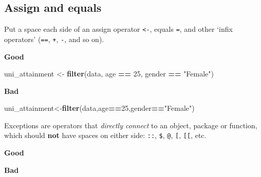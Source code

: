 \documentclass[]{book}
\newenvironment{Shaded}{\begin{snugshade}}{\end{snugshade}}
\newcommand{\DecValTok}[1]{\textcolor[rgb]{0.00,0.00,0.81}{#1}}
\newcommand{\KeywordTok}[1]{\textcolor[rgb]{0.13,0.29,0.53}{\textbf{#1}}}
\newcommand{\NormalTok}[1]{#1}
\newcommand{\OperatorTok}[1]{\textcolor[rgb]{0.81,0.36,0.00}{\textbf{#1}}}
\newcommand{\StringTok}[1]{\textcolor[rgb]{0.31,0.60,0.02}{#1}}
\begin{document}
\hypertarget{assign-and-equals}{%
\subsection{Assign and equals}\label{assign-and-equals}}

Put a space each side of an assign operator \texttt{\textless{}-}, equals \texttt{=}, and other `infix operators' (\texttt{==}, \texttt{+}, \texttt{-}, and so on).

\textbf{Good}

\begin{Shaded}
\begin{Highlighting}[]
\NormalTok{uni_attainment <-}\StringTok{ }\KeywordTok{filter}\NormalTok{(data, age }\OperatorTok{==}\StringTok{ }\DecValTok{25}\NormalTok{, gender }\OperatorTok{==}\StringTok{ "Female"}\NormalTok{)}
\end{Highlighting}
\end{Shaded}

\textbf{Bad}

\begin{Shaded}
\begin{Highlighting}[]
\NormalTok{uni_attainment<-}\KeywordTok{filter}\NormalTok{(data,age}\OperatorTok{==}\DecValTok{25}\NormalTok{,gender}\OperatorTok{==}\StringTok{"Female"}\NormalTok{)}
\end{Highlighting}
\end{Shaded}

Exceptions are operators that \emph{directly connect} to an object, package or function, which should \textbf{not} have spaces on either side: \texttt{::}, \texttt{\$}, \texttt{@}, \texttt{{[}}, \texttt{{[}{[}}, etc.

\textbf{Good}

\begin{Shaded}
\end{Shaded}

\textbf{Bad}

\begin{Shaded}
\end{Shaded}
\end{document}

